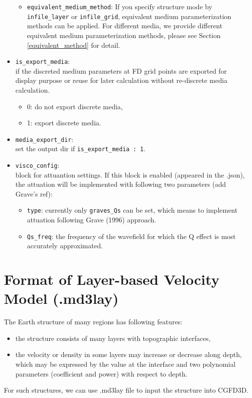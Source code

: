 \begin{itemize}
\begin{itemize}
  \item \texttt{equivalent\_medium\_method}: If you specify structure mode by
        \texttt{infile\_layer} or \texttt{infile\_grid},
        equivalent medium parameterization methods can be applied.
        For different media, we provide different equivalent medium parameterization methods,
        please see Section \ref{equivalent_method} for detail.
  \end{itemize}
   
\item \verb|is_export_media|: \\
  if the discreted medium parameters at FD grid points are exported 
       for display purpose or reuse for later calculation without re-discrete media calculation.
    \begin{itemize}
      \item 0: do not export discrete media,
      \item 1: export discrete media.
    \end{itemize}
\item \verb|media_export_dir|: \\
  set the output dir if \verb|is_export_media : 1|.
  
\item \verb|visco_config|: \\
  block for attuantion settings.
  If this block is enabled (appeared in the .json),
    the attuation will be implemented with following two parameters (add Grave's ref):
  \begin{itemize}
    \item \verb|type|: currently only \verb|graves_Qs| can be set, which means to implement
       attuation following Grave (1996) approach.
     \item \verb|Qs_freq|: the frequency of the wavefield for which 
          the Q effect is most accurately approximated.
  \end{itemize}

\end{itemize}


\section{Format of Layer-based Velocity Model (.md3lay)} \label{md3lay}

The Earth structure of many regions has following features:
\begin{itemize}
  \item the structure consists of many layers with topographic interfaces,
  \item the velocity or density in some layers may increase or decrease along depth,
      which may be expressed by the value at the interface
      and two polynomial parameters (coefficient and power) with respect to depth.
\end{itemize}
For such structures, we can use .md3lay file to input the structure into CGFD3D.


